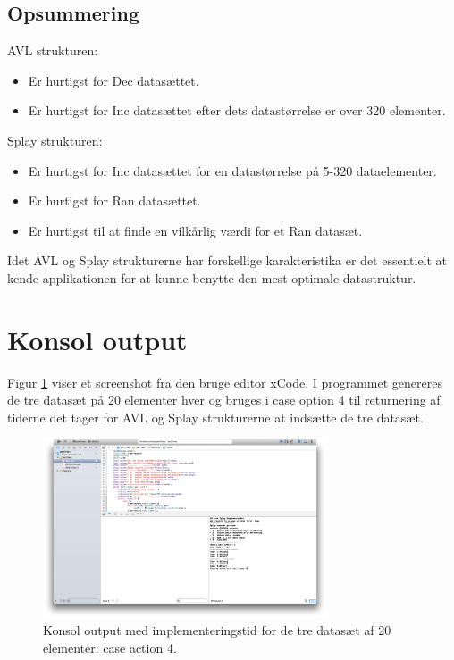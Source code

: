 \subsection{Opsummering}
\label{subsec:op}
AVL strukturen:
\begin{itemize}
\item Er hurtigst for Dec datasættet.
\item Er hurtigst for Inc datasættet efter dets datastørrelse er over 320 elementer.
\end{itemize}
Splay strukturen:
\begin{itemize}
\item Er hurtigst for Inc datasættet for en datastørrelse på 5-320 dataelementer.
\item Er hurtigst for Ran datasættet.
\item Er hurtigst til at finde en vilkårlig værdi for et Ran datasæt. 
\end{itemize}
Idet AVL og Splay strukturerne har forskellige karakteristika er det essentielt at kende applikationen for at kunne benytte den mest optimale datastruktur.  


\section{Konsol output}
Figur \ref{fig:console} viser et screenshot fra den bruge editor xCode. I programmet genereres de tre datasæt på 20 elementer hver og bruges i case option 4 til returnering af tiderne det tager for AVL og Splay strukturerne at indsætte de tre datasæt.
\begin{figure}[th!]
\centering
\includegraphics[width=0.75\textwidth]{./graphics/console}
\caption{Konsol output med implementeringstid for de tre datasæt af 20 elementer: case action 4.}
\label{fig:console}
\end{figure}